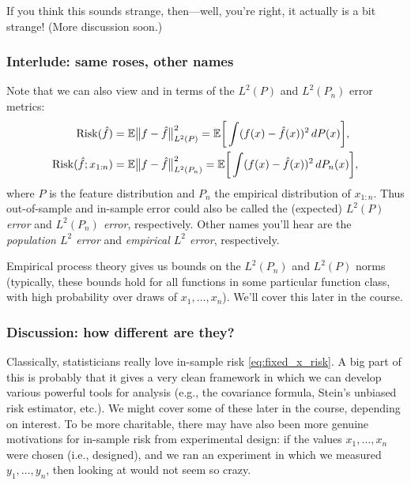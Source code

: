 \documentclass{article}
\begin{document}
If you think this sounds strange, then---well, you're right, it actually is a
bit strange! (More discussion soon.)

\subsubsection{Interlude: same roses, other names}

Note that we can also view \smash{$\Risk(\hf)$} and  in terms of the $L^2(P)$ and $L^2(P_n)$ error metrics:
\begin{align*}
\mathrm{Risk}(\hat{f}) &= \mathbb{E} \big\|f - \hat{f}\big\|_{L^2(P)}^2 
= \mathbb{E}\bigg[ \int (f(x) - \hat{f}(x))^2 \, dP(x) \bigg], \\
\mathrm{Risk}(\hat{f}; x_{1:n}) &= \mathbb{E} \big\|f - \hat{f}\big\|_{L^2(P_n)}^2  
= \mathbb{E}\bigg[ \int (f(x) - \hat{f}(x))^2 \, dP_n(x) \bigg],
\end{align*}
where $P$ is the feature distribution and $P_n$ the empirical distribution of
$x_{1:n}$. Thus out-of-sample and in-sample error could also be called the
(expected) \emph{$L^2(P)$ error} and \emph{$L^2(P_n)$ error},
respectively. Other names you'll hear are the \emph{population $L^2$ error} and
\emph{empirical $L^2$ error}, respectively.    

Empirical process theory gives us bounds on the $L^2(P_n)$ and $L^2(P)$ norms
(typically, these bounds hold for all functions in some particular function
class, with high probability over draws of $x_1,\dots,x_n$). We'll cover this
later in the course.    

\subsubsection{Discussion: how different are they?}

Classically, statisticians really love in-sample risk \eqref{eq:fixed_x_risk}. A
big part of this is probably that it gives a very clean framework in which we
can develop various powerful tools for analysis (e.g., the covariance formula,
Stein's unbiased risk estimator, etc.). We might cover some of these later in
the course, depending on interest. To be more charitable, there may have also
been more genuine motivations for in-sample risk from experimental design: if
the values $x_1,\dots,x_n$ were chosen (i.e., designed), and we ran an
experiment in which we measured $y_1,\dots,y_n$, then looking at
 would not seem so crazy.  
\end{document}
